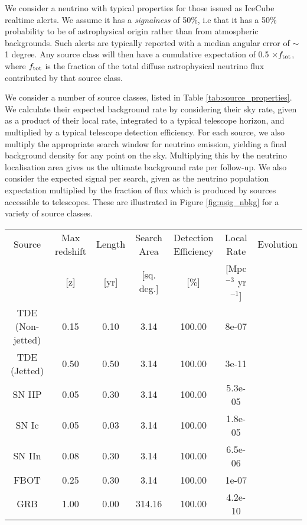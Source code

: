 We consider a neutrino with typical properties for those issued as IceCube realtime alerts. We assume it has a \emph{signalness} of 50\%, i.e that it has a 50\% probability to be of astrophysical origin rather than from atmospheric backgrounds. Such alerts are typically reported with a median angular error of $\sim$1 degree. Any source class will then have a cumulative expectation of 0.5 $\times f_{\textup{tot}}$, where $f_{\textup{tot}}$ is the fraction of the total diffuse astrophysical neutrino flux contributed by that source class. 
		
We consider a number of source classes, listed in Table \ref{tab:source_properties}. We calculate their expected background rate by considering their sky rate, given as a product of their local rate, integrated to a typical telescope horizon, and multiplied by a typical telescope detection efficiency. For each source, we also multiply the appropriate search window for neutrino emission, yielding a final background density for any point on the sky. Multiplying this by the neutrino localisation area gives us the ultimate background rate per follow-up. We also consider the expected signal per search, given as the neutrino population expectation multiplied by the fraction of flux which is produced by sources accessible to telescopes.  These are illustrated in Figure \ref{fig:nsig_nbkg} for a variety of source classes.

\begin{table*}[]
	\centering
	\begin{tabular}{||c c c c c c c|} 
	\hline
	Source & Max redshift & Length & Search Area & Detection Efficiency & Local Rate & Evolution \\
	& [z] & [yr] & [sq. deg.] & [\%] & [Mpc$^{-3}$ yr$^{-1}$] & \\
	\hline
	TDE (Non-jetted) & 0.15 & 0.10 & 3.14 & 100.00 & 8e-07 & \\
	TDE (Jetted) & 0.50 & 0.50 & 3.14 & 100.00 & 3e-11 & \\
	SN IIP & 0.05 & 0.30 & 3.14 & 100.00 & 5.3e-05 & \\
	SN Ic & 0.05 & 0.03 & 3.14 & 100.00 & 1.8e-05 & \\
	SN IIn & 0.08 & 0.30 & 3.14 & 100.00 & 6.5e-06 & \\
	FBOT & 0.25 & 0.30 & 3.14 & 100.00 & 1e-07 & \\
	GRB & 1.00 & 0.00 & 314.16 & 100.00 & 4.2e-10 & \\
	\hline
	\end{tabular}
	\caption{Summary of assumptions on source classes.}
	\label{tab:source_properties}
\end{table*}{}


